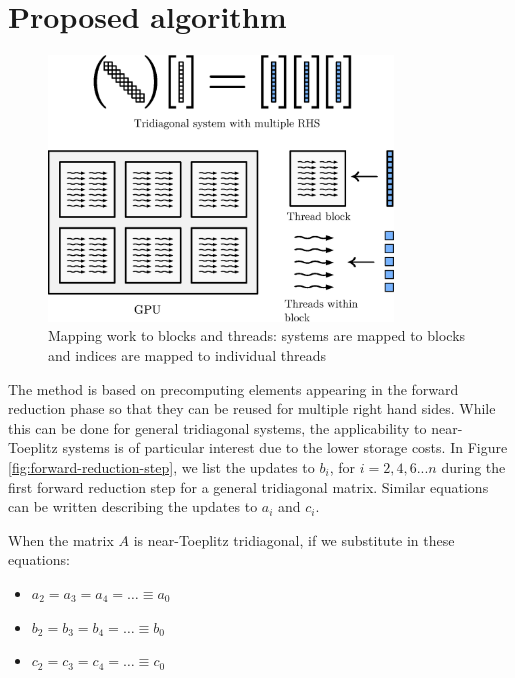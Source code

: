 \documentclass{elsarticle}
\begin{document}
\section{Proposed algorithm} \label{sec:proposed-algorithm}

\begin{figure}[h!]
\begin{center}
\includegraphics[height=200pt]{img/gpu-mapping.eps}
\end{center}
\label{fig:gpu-mapping}
\caption{Mapping work to blocks and threads:
systems are mapped to blocks and
indices are mapped to individual threads}
\end{figure}

The method is based on precomputing elements 
appearing in the forward reduction phase
so that they can be reused for multiple right hand sides.
While this can be done for general tridiagonal systems,
the applicability to near-Toeplitz systems is
of particular interest due to the lower storage costs.
In Figure \ref{fig:forward-reduction-step},
we list the updates to
$b_i$, for $i=2, 4, 6 ... n$
during the first forward reduction step
for a general tridiagonal matrix.
Similar equations can be written describing
the updates to $a_i$ and  $c_i$.

When the matrix $A$ is near-Toeplitz tridiagonal,
if we substitute in these equations:

\begin{itemize}
    \item [] $a_2 = a_3 = a_4 = \hdots \equiv a_0$
    \item [] $b_2 = b_3 = b_4 = \hdots \equiv b_0$
    \item [] $c_2 = c_3 = c_4 = \hdots \equiv c_0$
\end{itemize}
\end{document}
